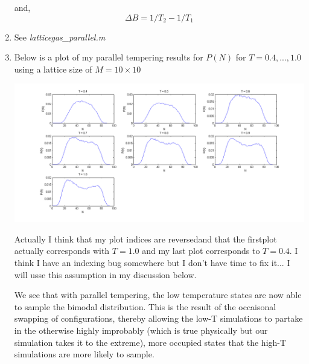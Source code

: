 \documentclass{article}
\begin{document}
\begin{enumerate}
    and,
    $$\Delta B = 1/T_2 - 1/T_1$$

  \item See \textit{latticegas\_parallel.m}

  \item Below is a plot of my parallel tempering results for $P(N)$ for $T = 0.4,...,1.0$ using a lattice size of $M = 10 \times 10$
    \begin{center}
      \includegraphics[scale=0.5]{prob2vii-1}
    \end{center}

    Actually I think that my plot indices are reversedand that the firstplot actually corresponds with $T=1.0$ and my last plot corresponds to $T=0.4$. I think I have an indexing bug somewhere but I don't have time to fix it... I will usse this assumption in my discussion below.

    We see that with parallel tempering, the low temperature states are now able to sample the bimodal distribution. This is the result of the occaisonal swapping of configurations, thereby allowing the low-T simulations to partake in the otherwise highly improbably (which is true physically but our simulation takes it to the extreme), more occupied states that the high-T simulations are more likely to sample. 

\end{enumerate}
\end{document}
